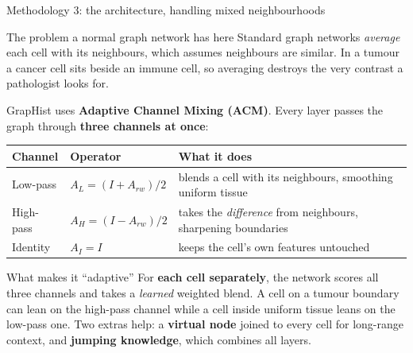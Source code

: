 \documentclass[aspectratio=169,11pt]{beamer}
\newcommand{\hl}[1]{\textcolor{haem}{\textbf{#1}}}
\begin{document}
\begin{frame}{Methodology 3: the architecture, handling mixed neighbourhoods}

  \begin{block}{The problem a normal graph network has here}
    \footnotesize Standard graph networks \emph{average} each cell with its
    neighbours, which assumes neighbours are similar. In a tumour a cancer cell
    sits beside an immune cell, so averaging destroys the very contrast a
    pathologist looks for.
  \end{block}

  {\small GrapHist uses \hl{Adaptive Channel Mixing (ACM)}. Every layer passes the
  graph through \textbf{three channels at once}:}\vspace{-0.2em}

  \begin{center}\scriptsize
  \begin{tabular}{@{}lll@{}}
    \toprule
    \textbf{Channel} & \textbf{Operator} & \textbf{What it does} \\
    \midrule
    Low-pass  & $A_L = (I + A_{rw})/2$ & blends a cell with its neighbours, smoothing uniform tissue \\
    High-pass & $A_H = (I - A_{rw})/2$ & takes the \emph{difference} from neighbours, sharpening boundaries \\
    Identity  & $A_I = I$              & keeps the cell's own features untouched \\
    \bottomrule
  \end{tabular}
  \end{center}

  \begin{alertblock}{What makes it ``adaptive''}
    \footnotesize For \textbf{each cell separately}, the network scores all three
    channels and takes a \emph{learned} weighted blend. A cell on a tumour
    boundary can lean on the high-pass channel while a cell inside uniform tissue
    leans on the low-pass one. Two extras help: a \hl{virtual node} joined to
    every cell for long-range context, and \hl{jumping knowledge}, which
    combines all layers.
  \end{alertblock}

\end{frame}
\end{document}
